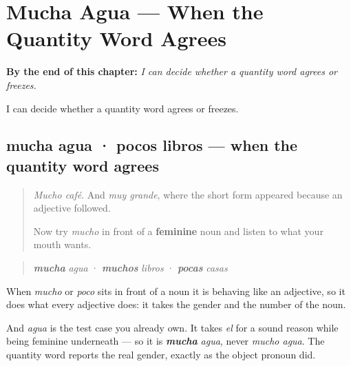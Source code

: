 
\chapter{Mucha Agua --- When the Quantity Word Agrees}
\label{ch:mucha-agua}

\begin{chapteropening}
\textbf{By the end of this chapter:} \emph{I can decide whether a quantity word agrees or freezes.}

I can decide whether a quantity word agrees or freezes.
\end{chapteropening}

\section[mucha agua · pocos libros]{mucha agua · pocos libros — when the quantity word agrees}

\label{lesson:ES-C66-mucha-agua}



\begin{quote}
\emph{Mucho café}. And \emph{muy grande}, where the short form appeared because an adjective followed.

Now try \emph{mucho} in front of a \textbf{feminine} noun and listen to what your mouth wants.
\end{quote}

\begin{grammarlens}[title={Grammar Lens: in front of a noun, it agrees}]
\begin{quote}
\emph{\textbf{mucha}} \emph{agua} · \emph{\textbf{muchos}} \emph{libros} · \emph{\textbf{pocas}} \emph{casas}
\end{quote}

When \emph{mucho} or \emph{poco} sits in front of a noun it is behaving like an adjective, so it does what every adjective does: it takes the gender and the number of the noun.

And \emph{agua} is the test case you already own. It takes \emph{el} for a sound reason while being feminine underneath — so it is \emph{\textbf{mucha}} \emph{agua}, never \emph{mucho agua}. The quantity word reports the real gender, exactly as the object pronoun did.
\end{grammarlens}

